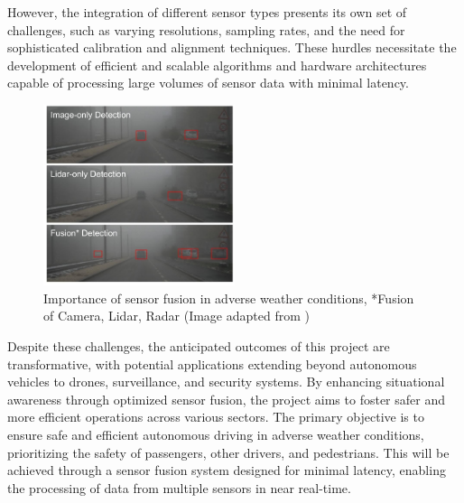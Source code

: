 \documentclass[report.tex]{subfiles}
\begin{document}
        However, the integration of different sensor types presents its own set of challenges, such as varying resolutions, sampling rates, and the need for sophisticated calibration and alignment techniques. These hurdles necessitate the development of efficient and scalable algorithms and hardware architectures capable of processing large volumes of sensor data with minimal latency.

        \begin{figure}[h]
            \centering
            \includegraphics[width=0.5\textwidth]{images/introduction/fusion_in_adverse_weather.png}
            \caption{Importance of sensor fusion in adverse weather conditions, *Fusion of Camera, Lidar, Radar (Image adapted from \cite{bijelic2020seeing})}
            \label{fig:sensors_intro_3}
        \end{figure}

        Despite these challenges, the anticipated outcomes of this project are transformative, with potential applications extending beyond autonomous vehicles to drones, surveillance, and security systems. By enhancing situational awareness through optimized sensor fusion, the project aims to foster safer and more efficient operations across various sectors. The primary objective is to ensure safe and efficient autonomous driving in adverse weather conditions, prioritizing the safety of passengers, other drivers, and pedestrians. This will be achieved through a sensor fusion system designed for minimal latency, enabling the processing of data from multiple sensors in near real-time.

\end{document}
